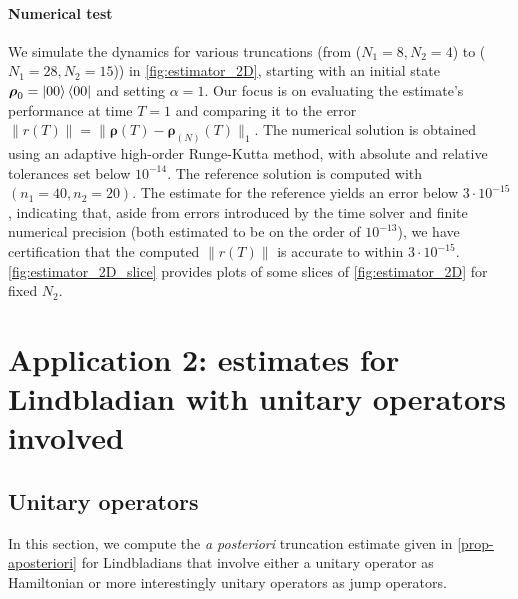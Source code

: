 \documentclass[a4paper,onecolumn,amsmath,amssymb,amsfonts,accepted=2026-03-06]{quantumarticle}
\newcommand{\rN}{{\boldsymbol{\rho}_{(N)}}}
\begin{document}
\paragraph{Numerical test}

We simulate the dynamics for various truncations (from ($N_1 = 8, N_2 = 4$) to ($N_1 = 28, N_2 = 15$)) in \cref{fig:estimator_2D}, starting with an initial state $\boldsymbol{\rho}_0 = \ket{00}\bra{00}$ and setting $\alpha=1$. Our focus is on evaluating the estimate's performance at time $T = 1$ and comparing it to the error $\|r(T)\| = \|\boldsymbol{\rho}(T) - \rN(T)\|_1$. The numerical solution is obtained using an adaptive high-order Runge-Kutta method, with absolute and relative tolerances set below $10^{-14}$. The reference solution is computed with $(n_1 = 40, n_2 = 20)$. The estimate for the reference yields an error below $3 \cdot 10^{-15}$, indicating that, aside from errors introduced by the time solver and finite numerical precision (both estimated to be on the order of $10^{-13}$), we have certification that the computed $\|r(T)\|$ is accurate to within $3 \cdot 10^{-15}$. \cref{fig:estimator_2D_slice} provides  plots of some slices of \cref{fig:estimator_2D} for fixed $N_2$.




\section{Application 2: estimates for Lindbladian with unitary operators involved}
\label{sec_ex2}


\subsection{Unitary operators}
\label{subsec:unitary}

In this section, we compute the \textit{a posteriori} truncation estimate given in \cref{prop-aposteriori} for Lindbladians that involve either a unitary operator as Hamiltonian or more interestingly unitary operators as jump operators.
\end{document}

